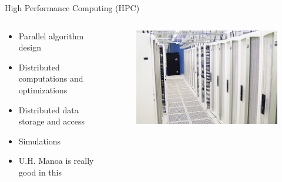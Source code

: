 \documentclass{beamer}
\begin{document}
\begin{frame}{High Performance Computing (HPC)}
\begin{columns}
	\begin{column}{.45\textwidth}
		\begin{itemize}
			\item Parallel algorithm design
			\item Distributed computations and optimizations
			\item Distributed data storage and access
			\item Simulations 
			\item U.H. Manoa is really good in this
		\end{itemize}
	\end{column}
	\begin{column}{.55\textwidth}
		\begin{figure}
			\includegraphics[width=\linewidth]{img/uhsuper.jpg}
		\end{figure}
	\end{column}
\end{columns}
\end{frame}
\end{document}
